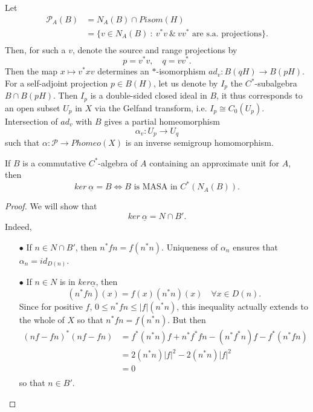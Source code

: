 Let 
\[\begin{split}
\mathcal P_A(B) & = N_A(B)\cap Pisom(H) \\
		& = \{ v \in N_A(B) \ : \ v^*v \ \& \ vv^* \text{ are s.a. projections} \}.\\
\end{split}\]
Then, for such a $v$, denote the source and range projections by
\[p = v^*v , \quad q= vv^*. \]
Then the map $x \mapsto v^*xv$ determines an $*$-isomorphism $ad_v : B(qH)\rightarrow B(pH)$. \\

For a self-adjoint projection $p\in B(H)$, let us denote by $I_p$ the $C^*$-subalgebra $B\cap B(pH)$. Then $I_p$ is a double-sided closed ideal in $B$, it thus corresponds to an open subset $U_p$ in $X$ via the Gelfand transform, i.e. $I_p\cong C_0(U_p)$. Intersection of $ad_v$ with $B$ gives a partial homeomorphism
\[\alpha_v : U_p \rightarrow U_q\]
such that $\alpha : \mathcal P \rightarrow Phomeo(X)$ is an inverse semigroup homomorphism.\\


\begin{prop}[Renault] 
If $B$ is a commutative $C^*$-algebra of $A$ containing an approximate unit for $A$, then 
\[ker \ \underline \alpha  = B \iff B \text{ is MASA in } C^*(N_A(B)). \] 
\end{prop}

\begin{proof}
We will show that 
\[ker \ \underline \alpha  = N\cap B'.\]
Indeed,
\begin{itemize}
\item[$\bullet$] If $n\in N\cap B'$, then $n^*f n = f (n^*n)$. Uniqueness of $\alpha_n$ ensures that $\alpha_n = id_{D(n)}$. 
\item[$\bullet$] If $n\in N $ is in $ker \underline \alpha$, then 
\[(n^*f n)(x) = f(x) (n^*n)(x) \quad \forall x\in D(n).\]
Since for positive $f$, $0 \leq n^*f n \leq  |f| (n^*n)$, this inequality actually extends to the whole of $X$ so that $n^*f n = f (n^*n)$. But then
\[\begin{split}
( nf-fn )^* (nf-fn) & = f^* (n^*n ) f + n^* f^*f n - (n^*f^* n)f - f^* (n^*f n)   \\
			& = 2 (n^*n)|f|^2 - 2 (n^*n) |f|^2 \\
			& = 0 \\
\end{split}\]
so that $n\in B'$.
\end{itemize}
\end{proof}

